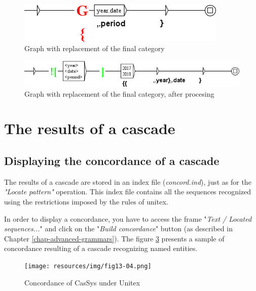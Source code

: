 \begin{figure}[!htb]
  \centering
  \includegraphics[width=10cm]{resources/img/graphe_remplacement.png}
  \caption{Graph with replacement of the final category}
  \label{fig:graphe_remplacement}
\end{figure}

\begin{figure}[!htb]
  \centering
  \includegraphics[width=14cm]{resources/img/graphe_remplacement_genere.png}
  \caption{Graph with replacement of the final category, after procesing}
  \label{fig:graphe_remplacement_genere}
\end{figure}

\section{The results of a cascade}

\subsection{Displaying the concordance of a cascade}
\label{subsec:resultsCascade}

The results of a cascade are stored in an index file (\textit{concord.ind}), just as for the \textit{"Locate pattern"} operation. This index file contains all the sequences recognized using the restrictions imposed by the rules of unitex.

\bigskip
\noindent In order to display a concordance, you have to access the frame "\textit{Text / Located sequences...}" and click on the "\textit{Build concordance}" button (as described in Chapter \ref{chap-advanced-grammars}).
The figure \ref{fig13-04} presents a sample of concordance resulting of a cascade recognizing named entities. 
\begin{figure}[!htb]
  \centering
  \texttt{[image: resources/img/fig13-04.png]}
  \caption{Concordance of CasSys under Unitex}
  \label{fig13-04}
\end{figure}

